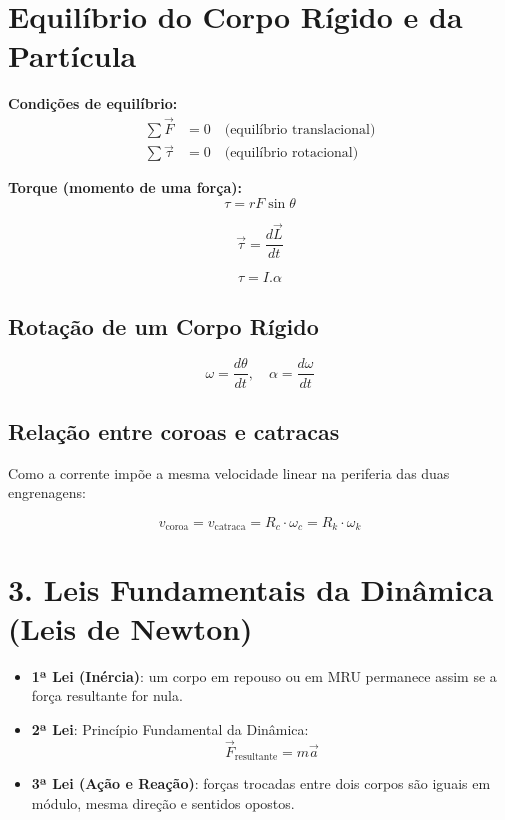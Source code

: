 \documentclass[a4paper,12pt]{article}
\begin{document}
\begin{multicols}{2}
\section{Equilíbrio do Corpo Rígido e da Partícula}

\textbf{Condições de equilíbrio:}
\begin{align*}
  \sum \vec{F} &= 0 \quad \text{(equilíbrio translacional)} \\
  \sum \vec{\tau} &= 0 \quad \text{(equilíbrio rotacional)}
\end{align*}

\textbf{Torque (momento de uma força):}
\begin{equation*}
  \tau = r F \sin \theta
\end{equation*}

\begin{equation}
  \vec{\tau} = \frac{d\vec{L}}{dt}
\end{equation}

\begin{equation}
  \tau = I.\alpha
\end{equation}

\subsection{Rota\c{c}\~ao de um Corpo R\'igido}
\begin{equation*}
  \omega = \frac{d\theta}{dt}, \quad \alpha = \frac{d\omega}{dt}
\end{equation*}

\subsection{Relação entre coroas e catracas}

Como a corrente impõe a mesma velocidade linear na periferia das duas engrenagens:

\begin{equation*}
  v_{\text{coroa}} = v_{\text{catraca}} = R_c \cdot \omega_c = R_k \cdot \omega_k
\end{equation*}


\section{3. Leis Fundamentais da Dinâmica (Leis de Newton)}

\begin{itemize}
  \item \textbf{1ª Lei (Inércia)}: um corpo em repouso ou em MRU permanece assim se a força resultante for nula.
  \item \textbf{2ª Lei}: Princ\'ipio Fundamental da Din\^amica:
  \begin{equation*}
    \vec{F}_{\text{resultante}} = m \vec{a}
  \end{equation*}
  \item \textbf{3ª Lei (Ação e Reação)}: forças trocadas entre dois corpos são iguais em módulo, mesma direção e sentidos opostos.
\end{itemize}


\end{multicols}
\end{document}
